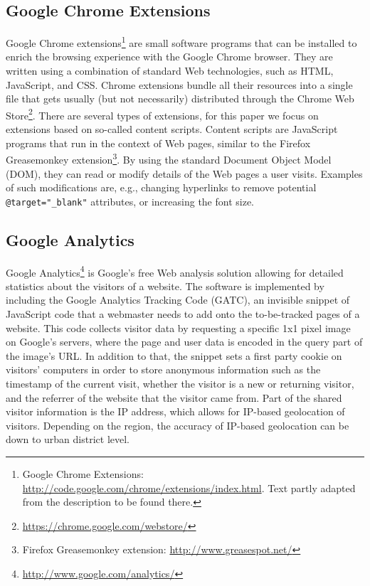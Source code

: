 \documentclass[runningheads,a4paper]{llncs}
\begin{document}
\subsection{Google Chrome Extensions}
Google Chrome extensions\footnote{Google Chrome Extensions: \url{http://code.google.com/chrome/extensions/index.html}. Text partly adapted from the description to be found there.} are small software programs that can be installed to enrich the browsing experience with the Google Chrome browser. They are written using a combination of standard Web technologies, such as HTML, JavaScript, and CSS. Chrome extensions bundle all their resources into a single file that gets usually (but not necessarily) distributed through the Chrome Web Store\footnote{\url{https://chrome.google.com/webstore/}}. There are several types of extensions, for this paper we focus on extensions based on so-called content scripts. Content scripts are JavaScript programs that run in the context of Web pages, similar to the Firefox Greasemonkey extension\footnote{Firefox Greasemonkey extension: \url{http://www.greasespot.net/}}. By using the standard Document Object Model (DOM), they can read or modify details of the Web pages a user visits. Examples of such modifications are, e.g., changing hyperlinks to remove potential \texttt{@target="\_blank"} attributes, or increasing the font size.

\subsection{Google Analytics}
Google Analytics\footnote{\url{http://www.google.com/analytics/}} is Google's free Web analysis solution allowing for detailed statistics about the visitors of a website. The software is implemented by including the Google Analytics Tracking Code (GATC), an invisible snippet of JavaScript code that a webmaster needs to add onto the to-be-tracked pages of a website. This code collects visitor data by requesting a specific 1x1 pixel image on Google's servers, where the page and user data is encoded in the query part of the image's URL. In addition to that, the snippet sets a first party cookie on visitors' computers in order to store anonymous information such as the timestamp of the current visit, whether the visitor is a new or returning visitor, and the referrer of the website that the visitor came from. Part of the shared visitor information is the IP address, which allows for IP-based geolocation of visitors. Depending on the region, the accuracy of IP-based geolocation can be down to urban district level.
 
\end{document}
